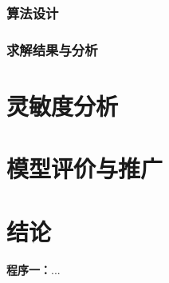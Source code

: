 \documentclass[a4paper]{cumcmthesis}
\begin{document}
\FloatBarrier\subsubsection{算法设计}

\FloatBarrier\subsubsection{求解结果与分析}


\section{灵敏度分析}

\section{模型评价与推广}

\section{结论}




\begin{appendices}
\textbf{程序一：}...
\end{appendices}
\end{document}
